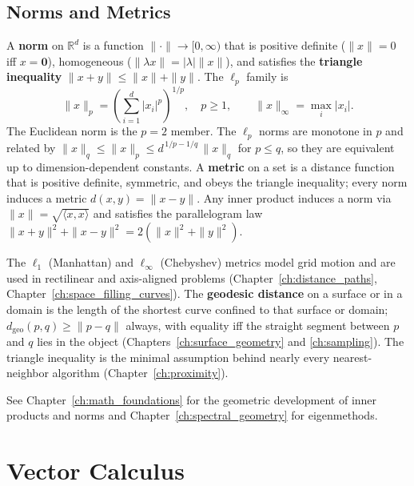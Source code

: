 \subsection{Norms and Metrics}
A \textbf{norm} on $\mathbb{R}^d$ is a function $\|\cdot\| \to [0,\infty)$
that is positive definite ($\|x\| = 0$ iff $x = \mathbf{0}$), homogeneous
($\|\lambda x\| = |\lambda| \|x\|$), and satisfies the \textbf{triangle
inequality} $\|x + y\| \le \|x\| + \|y\|$. The $\ell_p$ family is
\[
  \|x\|_p = \left( \sum_{i=1}^d |x_i|^p \right)^{1/p}, \quad p \ge 1,
  \qquad
  \|x\|_\infty = \max_i |x_i|.
\]
The Euclidean norm is the $p = 2$ member. The $\ell_p$ norms are monotone in
$p$ and related by
$\|x\|_q \le \|x\|_p \le d^{\,1/p - 1/q}\,\|x\|_q$ for $p \le q$, so they are
equivalent up to dimension-dependent constants. A \textbf{metric} on a set is
a distance function that is positive definite, symmetric, and obeys the
triangle inequality; every norm induces a metric $d(x,y) = \|x - y\|$.
Any inner product induces a norm via $\|x\| = \sqrt{\langle x, x\rangle}$ and
satisfies the parallelogram law
$\|x+y\|^2 + \|x-y\|^2 = 2(\|x\|^2 + \|y\|^2)$.

The $\ell_1$ (Manhattan) and $\ell_\infty$ (Chebyshev) metrics model grid
motion and are used in rectilinear and axis-aligned problems
(Chapter~\ref{ch:distance_paths}, Chapter~\ref{ch:space_filling_curves}).
The \textbf{geodesic distance} on a surface or in a domain is the length of
the shortest curve confined to that surface or domain;
$d_{\text{geo}}(p,q) \ge \|p - q\|$ always, with equality iff the straight
segment between $p$ and $q$ lies in the object
(Chapters~\ref{ch:surface_geometry} and \ref{ch:sampling}). The triangle
inequality is the minimal assumption behind nearly every nearest-neighbor
algorithm (Chapter~\ref{ch:proximity}).

See Chapter~\ref{ch:math_foundations} for the geometric development of inner
products and norms and Chapter~\ref{ch:spectral_geometry} for eigenmethods.

\section{Vector Calculus}
\label{sec:app_math_vector_calculus}

